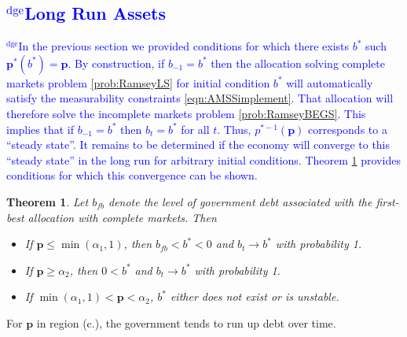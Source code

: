 \documentclass[12pt]{article}
\newcommand{\dge}[1]{\textcolor{blue}{$^{\textrm{dge}}${#1}}}
\newtheorem{theorem}{Theorem}[section]
\begin{document}
\subsection{\dge{Long Run Assets}}
\dge{In the previous section we provided conditions for which there exists $b^*$ such $\bm p^*(b^*) = \bm p$.  By construction, if $b_{-1} = b^*$ then the allocation solving complete markets problem \ref{prob:RamseyLS} for initial condition $b^*$ will automatically satisfy the measurability constraints \eqref{eqn:AMSSimplement}.  That allocation will therefore solve the incomplete markets problem \ref{prob:RamseyBEGS}.  This implies that if $b_{-1} = b^*$ then $b_t = b^*$ for all $t$.  Thus, $p^{*-1}(\bm p)$ corresponds to a ``steady state''.  It remains to be determined if the economy will converge to this ``steady state'' in the long run for arbitrary initial conditions.  Theorem \ref{thm:convergence} provides conditions for which this convergence can be shown.}
 	\begin{theorem}\label{thm:convergence}
Let %
$b_{fb}$ denote the level of  government  debt associated with the first-best allocation with complete markets.
Then %
		\begin{itemize}
			\item[a.]  If $\bm{p}\leq\min(\alpha_1,1)$, then  $b_{fb}<b^*<0$ and $b_t\rightarrow b^*$ with probability 1.
			\item[b.] If $\bm{p} \geq \alpha_2$, then   $0<b^*$ and $b_t \rightarrow b^*$ with probability 1.
            \item[c.] If $ \min(\alpha_1,1)<\bm{p}<\alpha_2 $,   $b^*$ either does not exist or is unstable.
									\end{itemize}			\end{theorem}
  For $\bm{p}$ in region (c.),
the government tends to run up debt over time.
\end{document}
